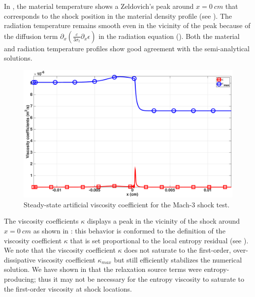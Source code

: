 \documentclass[times,doublespace]{fldauth}%
\begin{document}
%
In , the material temperature shows a Zeldovich's peak around $x=0 \ cm$ that corresponds to the shock position in the material density profile (see ). The radiation temperature remains smooth even in the vicinity of the peak because of the diffusion term $ \partial_x \left( \frac{c}{3 \sigma_t} \partial_x \epsilon \right)$ in the radiation equation (). Both the material and radiation temperature profiles show good agreement with the semi-analytical solutions.
%
\begin{figure}[H]
    \centering
    \includegraphics[width=\textwidth]{figures/cst-xs/mach_3_cst_xs_nel_1000_viscosity.eps}
    \caption{Steady-state artificial viscosity coefficient for the Mach-3 shock test.}\label{fig:mach-3-cst-xs-visc}
\end{figure}
%
The viscosity coefficients $\kappa$ displays a peak in the vicinity of the shock around $x=0 \ cm$ as shown in : this behavior is conformed to the definition of the viscosity coefficient $\kappa$ that is set proportional to the local entropy residual (see ). We note that the viscosity coefficient $\kappa$ does not saturate to the first-order, over-dissipative viscosity coefficient $\kappa_{max}$ but still efficiently stabilizes the numerical solution. We have shown
in  that the relaxation source terms were entropy-producing; thus it may not be necessary for the entropy viscosity to saturate to the first-order viscosity at shock locations.
%
\end{document}
